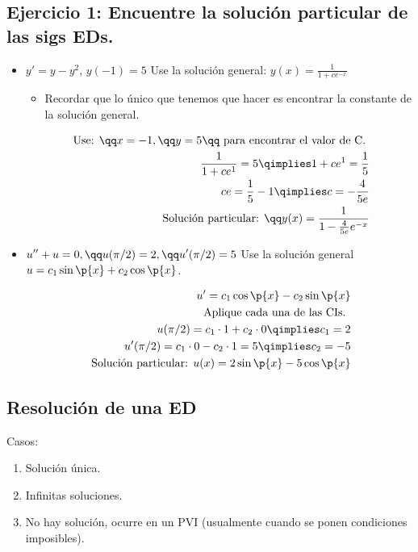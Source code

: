 \subsection{Ejercicio 1: Encuentre la solución particular de las sigs EDs.}
\begin{itemize}
    \item $\displaystyle y'=y-y^2$, $\displaystyle y(-1)=5$ Use la solución general: $\displaystyle y(x)=\frac{1}{1+ce^{-x}}$ 
        \begin{itemize}
            \item Recordar que lo único que tenemos que hacer es encontrar la constante de la solución general.
        \end{itemize}
        \begin{center}
           \begin{align*}
               \text{ Use: } \qq x=-1, \qq y=5 \qq \text{ para encontrar el valor de C. } \\ 
               \frac{1}{1+ce^1}=5 \qimplies 1+ce^1=\frac{1}{5} \\ 
               ce=\frac{1}{5}-1 \qimplies  c= -\frac{4}{5e} \\ 
               \text{ Solución particular: } \qq y(x)=\frac{1}{1-\frac{4}{5e}e^{-x}} \\ 
           \end{align*}
        \end{center}
    
    \item $\displaystyle u''+u=0, \qq u(\pi/2)=2, \qq u'(\pi/2)=5$ Use la solución general $\displaystyle u = c_1\sin\p{ x } +c_2\cos\p{ x } $.
        \begin{center}
           \begin{align*}
               u' = c_1\cos\p{ x } -c_2\sin\p{ x } \\ 
               \text{ Aplique cada una de las CIs. } \\ 
               u(\pi/2) = c_1\cdot 1 + c_2\cdot 0 \qimplies  c_1 = 2 \\ 
               u'(\pi/2) = c_1\cdot 0 - c_2\cdot 1 = 5 \qimplies c_2 = -5 \\ 
               \text{ Solución particular: } u(x) = 2\sin\p{ x } -5\cos\p{ x } \\ 
           \end{align*}
        \end{center}
\end{itemize}


\subsection{Resolución de una ED}
Casos:
\begin{enumerate}
    \item Solución única.
    \item Infinitas soluciones.
    \item No hay solución, ocurre en un PVI (usualmente cuando se ponen condiciones imposibles).
\end{enumerate}


